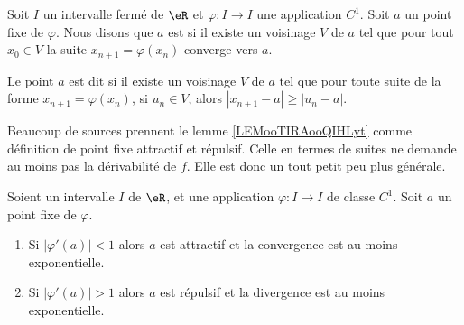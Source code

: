 \begin{definition}      \label{DEFooTMZUooMoBDGC}
	Soit \( I\) un intervalle fermé de \( \eR\) et \( \varphi\colon I\to I\) une application \( C^1\). Soit \( a\) un point fixe de \( \varphi\). Nous disons que \( a\) est  si il existe un voisinage \( V\) de \( a\) tel que pour tout \( x_0\in V\) la suite \( x_{n+1}=\varphi(x_n)\) converge vers \( a\).

	Le point \( a\) est dit  si il existe un voisinage \( V\) de \( a\) tel que pour toute suite de la forme \( x_{n+1}=\varphi(x_n) \), si \( u_n\in V\), alors \( | x_{n+1}-a |\geq | u_n-a |\).
\end{definition}

\begin{normaltext}
	Beaucoup de sources prennent le lemme \ref{LEMooTIRAooQIHLyt} comme définition de point fixe attractif et répulsif. Celle en termes de suites ne demande au moins pas la dérivabilité de \( f\). Elle est donc un tout petit peu plus générale.
\end{normaltext}

\begin{lemma}		\label{LEMooTIRAooQIHLyt}
	Soient un intervalle \( I\) de \( \eR\), et une application \(\varphi \colon I\to I  \) de classe \( C^1\). Soit \( a\) un point fixe de \( \varphi\).
	\begin{enumerate}
		\item
		      Si \( | \varphi'(a) |<1\) alors \( a\) est attractif et la convergence est au moins exponentielle.
		\item
		      Si \( | \varphi'(a) |>1\) alors \( a\) est répulsif et la divergence est au moins exponentielle.
	\end{enumerate}
\end{lemma}

